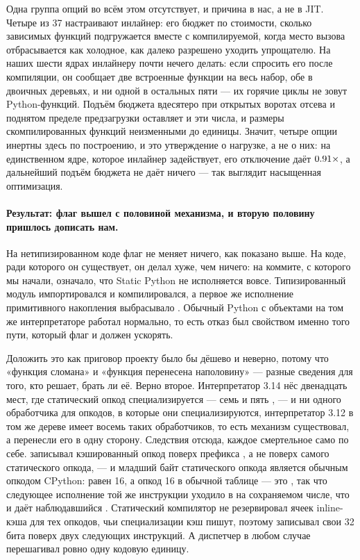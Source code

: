 Одна группа опций во всём этом отсутствует, и причина в нас, а не в JIT. Четыре из 37 настраивают
инлайнер: его бюджет по стоимости, сколько зависимых функций подгружается вместе с компилируемой,
когда место вызова отбрасывается как холодное, как далеко разрешено уходить упрощателю. На наших
шести ядрах инлайнеру почти нечего делать: если спросить его после компиляции, он сообщает две
встроенные функции на весь набор, обе в двоичных деревьях, и ни одной в остальных пяти --- их
горячие циклы не зовут Python-функций. Подъём бюджета вдесятеро при открытых воротах отсева и
поднятом пределе предзагрузки оставляет и эти числа, и размеры скомпилированных функций
неизменными до единицы. Значит, четыре опции инертны здесь по построению, и это утверждение о
нагрузке, а не о них: на единственном ядре, которое инлайнер задействует, его отключение даёт
$\meas{ratio:b6_cinderx-jitopt_default:binarytrees/jitopt_default|b6_cinderx-jitopt_no_inliner:binarytrees/jitopt_no_inliner}{0.91}\times$, а дальнейший подъём бюджета не даёт ничего --- так выглядит насыщенная оптимизация.

\paragraph{Результат: флаг вышел с половиной механизма, и вторую половину пришлось дописать нам.}
На нетипизированном коде флаг не меняет ничего, как показано выше. На коде, ради которого он
существует, он делал хуже, чем ничего: на коммите, с которого мы начали,
 означало, что Static Python не исполняется вовсе.
Типизированный модуль импортировался и компилировался, а первое же исполнение примитивного
накопления  выбрасывало
. Обычный Python с объектами на том же интерпретаторе
работал нормально, то есть отказ был свойством именно того пути, который флаг и должен ускорять.

Доложить это как приговор проекту было бы дёшево и неверно, потому что «функция сломана» и «функция
перенесена наполовину» --- разные сведения для того, кто решает, брать ли её. Верно второе.
Интерпретатор 3.14 нёс двенадцать мест, где статический опкод специализируется --- семь
 и пять , --- и ни одного обработчика для
опкодов, в которые они специализируются, интерпретатор 3.12 в том же дереве имеет восемь таких
обработчиков, то есть механизм существовал, а перенесли его в одну сторону. Следствия отсюда, каждое
смертельное само по себе.  записывал кэшированный опкод поверх
префикса , а не поверх самого статического опкода, --- и младший байт
статического опкода является обычным опкодом CPython:  равен 16, а
опкод 16 в обычной таблице --- это , так что следующее исполнение той же инструкции
уходило в  на сохраняемом числе, что и даёт наблюдавшийся .
Статический компилятор не резервировал ячеек inline-кэша для тех опкодов, чьи специализации кэш
пишут, поэтому  записывал свои 32 бита поверх двух следующих инструкций. А диспетчер в
любом случае перешагивал ровно одну кодовую единицу.

